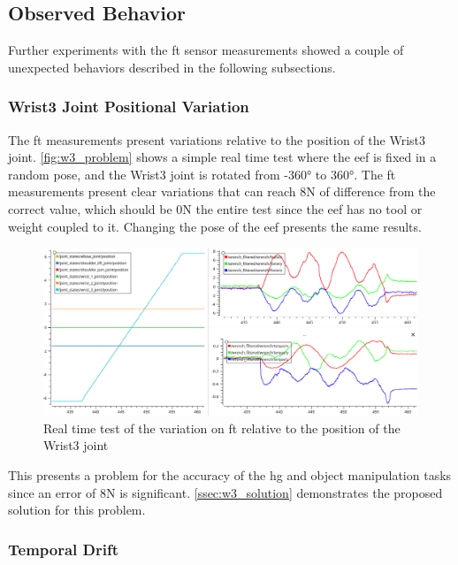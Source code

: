 \subsection{Observed Behavior}
\label{ssec:ft_sensor_behavior}

\par Further experiments with the \ac{ft} sensor measurements showed a couple of unexpected behaviors described in the following subsections.

\subsubsection{Wrist3 Joint Positional Variation}

\par The \ac{ft} measurements present variations relative to the position of the Wrist3 joint. \autoref{fig:w3_problem} shows a simple real time test where the \ac{eef} is fixed in a random pose, and the Wrist3 joint is rotated from \ang{-360} to \ang{360}. The \ac{ft} measurements present clear variations that can reach 8N of difference from the correct value, which should be 0N the entire test since the \ac{eef} has no tool or weight coupled to it. Changing the pose of the \ac{eef} presents the same results. 

\begin{figure}[h]
    \centering
    \includegraphics[width=0.9\linewidth]{figs/chp3/wrist_3_problem.png}
    \caption{Real time test of the variation on \ac{ft} relative to the position of the Wrist3 joint}
    \label{fig:w3_problem}
\end{figure}

\par This presents a problem for the accuracy of the \ac{hg} and object manipulation tasks since an error of 8N is significant. \autoref{ssec:w3_solution} demonstrates the proposed solution for this problem.

\subsubsection{Temporal Drift}


